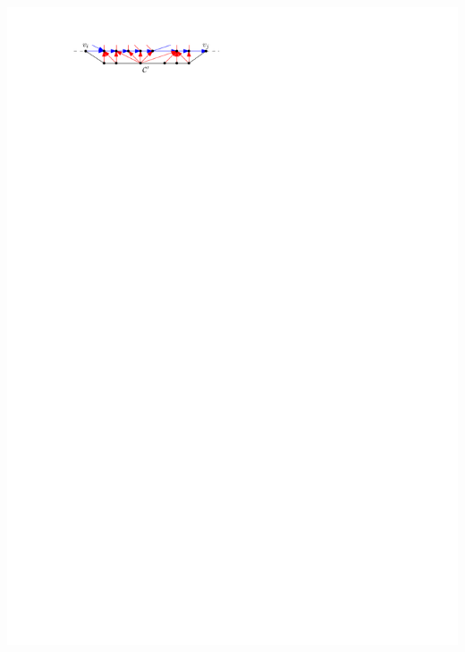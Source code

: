 \documentclass[a4paper]{article}
\begin{document}
\includegraphics[width =\textwidth]{./unifiedAlgo/img/sweep/updateAfter.pdf}
\clearpage%
\end{document}
